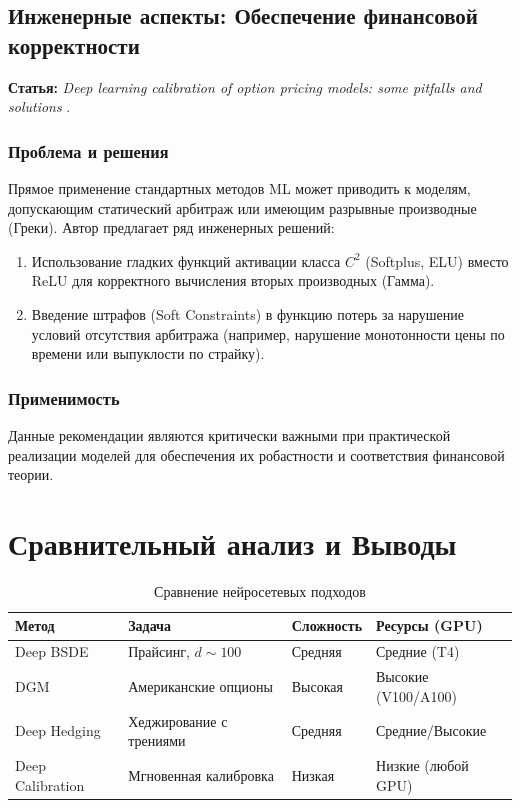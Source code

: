\subsection{Инженерные аспекты: Обеспечение финансовой корректности}
\textbf{Статья:} \textit{Deep learning calibration of option pricing models: some pitfalls and solutions} \cite{Itkin2019}.

\subsubsection{Проблема и решения}
Прямое применение стандартных методов ML может приводить к моделям, допускающим статический арбитраж или имеющим разрывные производные (Греки).
Автор предлагает ряд инженерных решений:
\begin{enumerate}
    \item Использование гладких функций активации класса $C^2$ (Softplus, ELU) вместо ReLU для корректного вычисления вторых производных (Гамма).
    \item Введение штрафов (Soft Constraints) в функцию потерь за нарушение условий отсутствия арбитража (например, нарушение монотонности цены по времени или выпуклости по страйку).
\end{enumerate}

\subsubsection{Применимость}
Данные рекомендации являются критически важными при практической реализации моделей для обеспечения их робастности и соответствия финансовой теории.
\section{Сравнительный анализ и Выводы}

\begin{table}[h!]
    \centering
    \caption{Сравнение нейросетевых подходов}
    \label{tab:comparison}
    \begin{tabular}{|p{3cm}|p{4cm}|p{3cm}|p{4cm}|}
        \hline
        \textbf{Метод} & \textbf{Задача} & \textbf{Сложность} & \textbf{Ресурсы (GPU)} \\
        \hline
        Deep BSDE & Прайсинг, $d \sim 100$ & Средняя & Средние (T4) \\
        \hline
        DGM & Американские опционы & Высокая & Высокие (V100/A100) \\
        \hline
        Deep Hedging & Хеджирование с трениями & Средняя & Средние/Высокие \\
        \hline
        Deep Calibration & Мгновенная калибровка & Низкая & Низкие (любой GPU) \\
        \hline
    \end{tabular}
\end{table}


